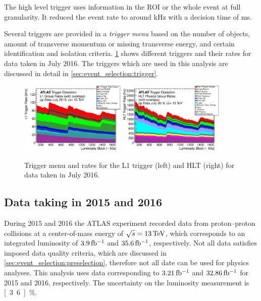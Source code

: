 The high level trigger uses information in the ROI or the whole event at full granularity.
It reduced the event rate to around \unit[1]{kHz} with a decision time of \unit[200]{ms}.

Several triggers are provided in a \emph{trigger menu} based on the number of objects,
amount of transverse momentum or missing transverse energy, and certain identification and
isolation criteria.
\cref{fig:setup:triggermenu} shows different triggers and their rates for data taken in July 2016.
The triggers which are used in this analysis are discussed in detail in \cref{sec:event_selection:trigger}.

\begin{figure}[htb]
    \centering
    \includegraphics[width=0.45\textwidth]{./figures/setup/l1_trigger_menu_2016.eps}
    \includegraphics[width=0.45\textwidth]{./figures/setup/hlt_trigger_menu_2016.eps}
    \caption{Trigger menu and rates for the L1 trigger (left) and HLT (right) for data taken in July 2016.~\cite{TriggerMenu2016}}\label{fig:setup:triggermenu}
\end{figure}


\subsection{Data taking in 2015 and 2016}\label{sec:setup:data}

During 2015 and 2016 the ATLAS experiment recorded data from proton--proton collisions at a center-of-mass energy
of $\sqrt{s} = \unit[13]{TeV}$, which corresponds to an integrated luminosity of $\unit[3.9]{fb^{-1}}$ and $\unit[35.6]{fb^{-1}}$, respectively.
Not all data satisfies imposed data quality criteria, which are discussed in \cref{sec:event_selection:preselection},
therefore not all date can be used for physics analyses.
This analysis uses data corresponding to $\unit[3.21]{fb^{-1}}$ and $\unit[32.86]{fb^{-1}}$ for 2015 and 2016, respectively.
The uncertainty on the luminosity measurement is \unit[3.6]{\%}.

